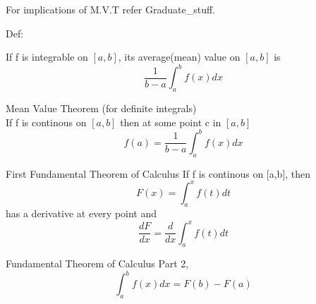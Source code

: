 \documentclass{../template/texnote}
\begin{document}
    For implications of M.V.T refer Graduate\_stuff.

    \par
    Def:

        If f is integrable on $[a,b]$, its average(mean) value on $[a,b]$ is 
        $$ \frac{1}{b-a} \int_a^b f(x) dx$$
        
        Mean Value Theorem (for definite integrals) \\
        If f is continous on $[a,b]$ then at some point c in $[a,b]$
        $$ f(a) = \frac{1}{b-a}\int_a^b f(x) dx $$

        First Fundamental Theorem of Calculus
        If f is continous on [a,b], then 
        $$ F(x) = \int_a^x f(t) dt $$
        has a derivative at every point and 
        $$ \frac{dF}{dx} = \frac{d}{dx} \int_a^xf(t)dt $$

        Fundamental Theorem of Calculus Part 2,
        $$ \int_a^b f(x) dx = F(b) - F(a) $$
    \printbibliography
\end{document}
